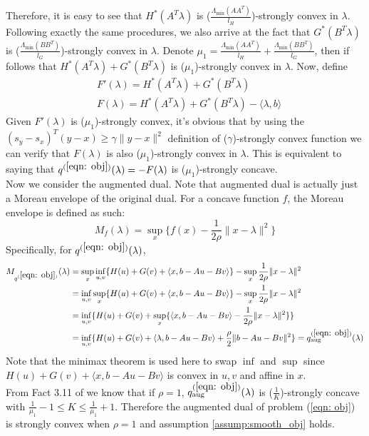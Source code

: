 \documentclass[11pt]{article}
\theoremstyle{plain}
\theoremstyle{definition}
\theoremstyle{remark}
\begin{document}
Therefore, it is easy to see that $H^*(A^T\lambda)$ is ($\frac{\Lambda_{\text{min}}(AA^T)}{l_H}$)-strongly convex in $\lambda$. Following exactly the same procedures, we also arrive at the fact that $G^*(B^T \lambda)$ is ($\frac{\Lambda_{\text{min}}(BB^T)}{l_G}$)-strongly convex in $\lambda$.
Denote $\mu_1 = \frac{\Lambda_{\text{min}}(AA^T)}{l_H} + \frac{\Lambda_{\text{min}}(BB^T)}{l_G}$, then if follows that $H^*(A^T \lambda)+G^*(B^T \lambda)$ is ($\mu_1$)-strongly convex in $\lambda$. Now, define 
\begin{equation}
\begin{aligned}
	&F'(\lambda) = H^*(A^T \lambda)+G^*(B^T \lambda) \\
	&F(\lambda) = H^*(A^T \lambda)+G^*(B^T \lambda) - \langle \lambda,b \rangle
\end{aligned}
\end{equation}
Given $F'(\lambda)$ is ($\mu_1$)-strongly convex, it's obvious that by using the $(s_y - s_x)^T(y-x) \geq \gamma \|y-x\|^2$ definition of ($\gamma$)-strongly convex function we can verify that $F(\lambda)$ is also ($\mu_1$)-strongly convex in $\lambda$. This is equivalent to saying that $q^{(\ref{eqn: obj})}(\lambda) = -F(\lambda)$ is ($\mu_1$)-strongly concave.\\
Now we consider the augmented dual. Note that augmented dual is actually just a Moreau envelope of the original dual. For a concave function $f$, the Moreau envelope is defined as such:
\begin{equation}
	M_f(\lambda) = \sup_{x} \{f(x) - \frac{1}{2\rho} \|x-\lambda\|^2\}
\end{equation} 
Specifically, for $q^{(\ref{eqn: obj})}(\lambda)$, 
\begin{equation}
	\begin{aligned}
		M_{q^{(\ref{eqn: obj})}}(\lambda) &= \sup_{x} \inf_{u,v} \{H(u)+G(v)+\langle x, b-Au-Bv \rangle \} - \sup_{x} \frac{1}{2\rho} \|x-\lambda\|^2 \\
		&=  \inf_{u,v} \sup_{x} \{H(u)+G(v)+\langle x, b-Au-Bv \rangle \} - \sup_{x} \frac{1}{2\rho} \|x-\lambda\|^2 \\
		&= \inf_{u,v} \{ H(u)+G(v) + \sup_{x} \{ \langle x, b-Au-Bv \rangle - \frac{1}{2\rho} \|x-\lambda\|^2\}\} \\
		&= \inf_{u,v} \{ H(u)+G(v) + \langle \lambda, b-Au-Bv \rangle + \frac{\rho}{2}\|b-Au-Bv\|^2\} = q^{(\ref{eqn: obj})}_{\text{aug}}(\lambda)
	\end{aligned}
\end{equation}
Note that the minimax theorem is used here to swap $\inf$ and $\sup$ since $H(u)+G(v)+\langle x, b-Au-Bv \rangle $ is convex in $u,v$ and affine in $x$.\\
From Fact 3.11 of \cite{planiden2019proximal} we know that if $\rho=1$,  $q^{(\ref{eqn: obj})}_{\text{aug}}(\lambda)$ is ($\frac{1}{K}$)-strongly concave with $\frac{1}{\mu_1}-1 \leq K \leq \frac{1}{\mu_1}+1$. Therefore the augmented dual of problem (\ref{eqn: obj}) is strongly convex when $\rho=1$ and assumption \ref{assump:smooth_obj} holds.
\end{document}
